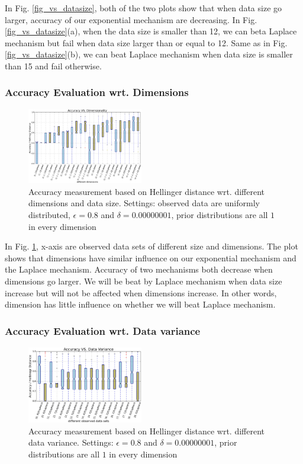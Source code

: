 \documentclass[sigconf, anonymous]{acmart}
\begin{document}
In Fig. \ref{fig_vs_datasize}, both of the two plots show that when data size go larger, accuracy of our exponential mechanism are decreasing. In Fig. \ref{fig_vs_datasize}(a), when the data size is smaller than 12, we can beta Laplace mechanism but fail when data size larger than or equal to 12. Same as in Fig. \ref{fig_vs_datasize}(b), we can beat Laplace mechanism when data size is smaller than 15 and fail otherwise.

\subsubsection{Accuracy Evaluation wrt. Dimensions}
\label{subsubsec_vs_dimension}


\begin{figure}[ht]
\centering
\includegraphics[width=0.45\textwidth]{accuracy_vs_dimension.eps}
\caption{Accuracy measurement based on Hellinger distance wrt. different dimensions and data size. Settings: observed data are uniformly distributed, $\epsilon = 0.8$ and $\delta = 0.00000001$, prior distributions are all $1$ in every dimension}
\label{fig_vs_dimension}
\end{figure}

In Fig. \ref{fig_vs_dimension}, x-axis are observed data sets of different size and dimensions. The plot shows that dimensions have similar influence on our exponential mechanism and the Laplace mechanism. Accuracy of two mechanisms both decrease when dimensions go larger. We will be beat by Laplace mechanism when data size increase but will not be affected when dimensions increase. In other words, dimension has little influence on whether we will beat Laplace mechanism.


\subsubsection{Accuracy Evaluation wrt. Data variance}
\label{subsubsec_vs_variance}

\begin{figure}[ht]
\centering
\includegraphics[width=0.45\textwidth]{accuracy_vs_mean_1_1.eps}
\caption{Accuracy measurement based on Hellinger distance wrt. different data variance. Settings: $\epsilon = 0.8$ and $\delta = 0.00000001$, prior distributions are all $1$ in every dimension}
\label{fig_vs_variance}
\end{figure}
\end{document}
